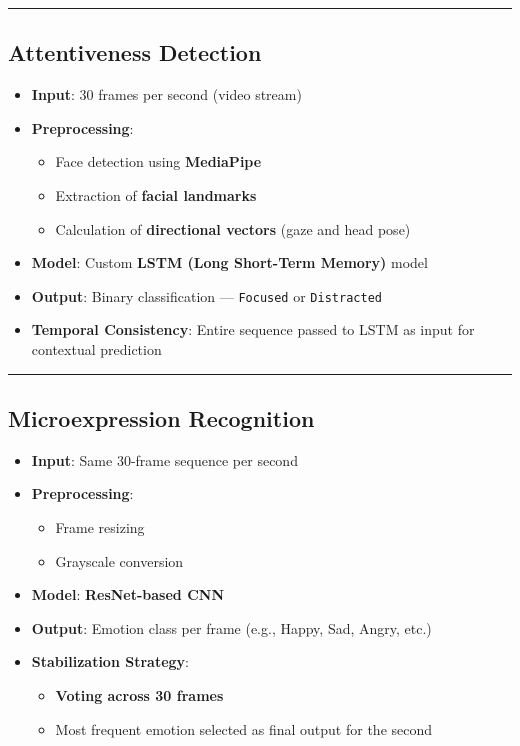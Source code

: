 \documentclass[
  letterpaper,
  DIV=11,
  numbers=noendperiod]{scrreport}
\providecommand{\tightlist}{%
  \setlength{\itemsep}{0pt}\setlength{\parskip}{0pt}}
\begin{document}
\begin{center}\rule{0.5\linewidth}{0.5pt}\end{center}

\subsection{Attentiveness Detection}\label{attentiveness-detection}

\begin{itemize}
\tightlist
\item
  \textbf{Input}: 30 frames per second (video stream)
\item
  \textbf{Preprocessing}:

  \begin{itemize}
  \tightlist
  \item
    Face detection using \textbf{MediaPipe}
  \item
    Extraction of \textbf{facial landmarks}
  \item
    Calculation of \textbf{directional vectors} (gaze and head pose)
  \end{itemize}
\item
  \textbf{Model}: Custom \textbf{LSTM (Long Short-Term Memory)} model
\item
  \textbf{Output}: Binary classification --- \texttt{Focused} or
  \texttt{Distracted}
\item
  \textbf{Temporal Consistency}: Entire sequence passed to LSTM as input
  for contextual prediction
\end{itemize}

\begin{center}\rule{0.5\linewidth}{0.5pt}\end{center}

\subsection{Microexpression
Recognition}\label{microexpression-recognition}

\begin{itemize}
\tightlist
\item
  \textbf{Input}: Same 30-frame sequence per second
\item
  \textbf{Preprocessing}:

  \begin{itemize}
  \tightlist
  \item
    Frame resizing
  \item
    Grayscale conversion
  \end{itemize}
\item
  \textbf{Model}: \textbf{ResNet-based CNN}
\item
  \textbf{Output}: Emotion class per frame (e.g., Happy, Sad, Angry,
  etc.)
\item
  \textbf{Stabilization Strategy}:

  \begin{itemize}
  \tightlist
  \item
    \textbf{Voting across 30 frames}
  \item
    Most frequent emotion selected as final output for the second
  \end{itemize}
\end{itemize}
\end{document}
